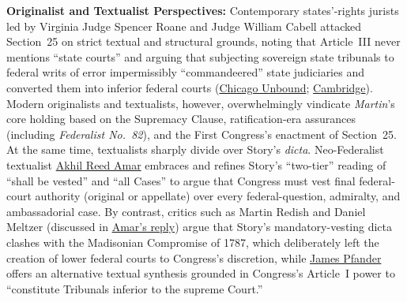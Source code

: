 \documentclass[12pt]{article}
\begin{document}
\textbf{Originalist and Textualist Perspectives:} Contemporary states'-rights jurists led by Virginia Judge Spencer Roane and Judge William Cabell attacked Section~25 on strict textual and structural grounds, noting that Article~III never mentions ``state courts'' and arguing that subjecting sovereign state tribunals to federal writs of error impermissibly ``commandeered'' state judiciaries and converted them into inferior federal courts (\href{https://chicagounbound.uchicago.edu/cgi/viewcontent.cgi?article=1427&context=journal_articles}{Chicago Unbound}; \href{https://www.cambridge.org/core/books/monitoring-american-federalism/state-challenges-to-the-supreme-courts-control-over-constitutional-interpretation/85539C2F1811467C31EF62DBD350C7D8}{Cambridge}). Modern originalists and textualists, however, overwhelmingly vindicate \textit{Martin}'s core holding based on the Supremacy Clause, ratification-era assurances (including \textit{Federalist No.~82}), and the First Congress's enactment of Section~25. At the same time, textualists sharply divide over Story's \textit{dicta}. Neo-Federalist textualist \href{https://openyls.law.yale.edu/bitstreams/f4002d33-80ce-42a7-be16-e38c2f5930f0/download}{Akhil Reed Amar} embraces and refines Story's ``two-tier'' reading of ``shall be vested'' and ``all Cases'' to argue that Congress must vest final federal-court authority (original or appellate) over every federal-question, admiralty, and ambassadorial case. By contrast, critics such as Martin Redish and Daniel Meltzer (discussed in \href{https://openyls.law.yale.edu/bitstreams/f4002d33-80ce-42a7-be16-e38c2f5930f0/download}{Amar's reply}) argue that Story's mandatory-vesting dicta clashes with the Madisonian Compromise of 1787, which deliberately left the creation of lower federal courts to Congress's discretion, while \href{https://wwws.law.northwestern.edu/faculty/fulltime/pfander/stateinferiority.pdf}{James Pfander} offers an alternative textual synthesis grounded in Congress's Article~I power to ``constitute Tribunals inferior to the supreme Court.''
\end{document}
